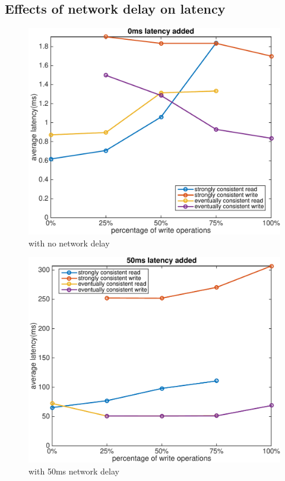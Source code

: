 \subsection{Effects of network delay on latency}
\begin{figure}[hbt]
\centering
\includegraphics[width=0.95\linewidth]{figures/latency_0.pdf}
\caption{with no network delay}
\label{fig:latency_0}
\end{figure}

\begin{figure}[hbt]
\centering
\includegraphics[width=0.95\linewidth]{figures/latency_50.pdf}
\caption{with 50ms network delay}
\label{fig:latency_50}
\end{figure}

